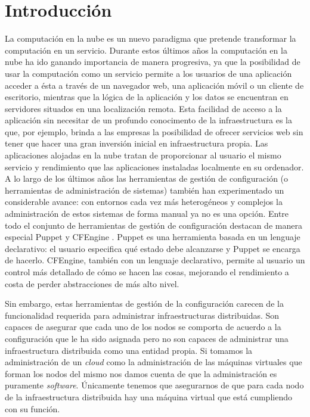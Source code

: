 \chapter{Introducción}
\label{cap:introduccion}


La computación en la nube es un nuevo paradigma que pretende transformar la computación en un servicio. Durante estos últimos años la computación en la nube ha ido ganando importancia de manera progresiva, ya que la posibilidad de usar la computación como un servicio permite a los usuarios de una aplicación acceder a ésta a través de un navegador web, una aplicación móvil o un cliente de escritorio, mientras que la lógica de la aplicación y los datos se encuentran en servidores situados en una localización remota. Esta facilidad de acceso a la aplicación sin necesitar de un profundo conocimento de la infraestructura es la que, por ejemplo, brinda a las empresas la posibilidad de ofrecer servicios web sin tener que hacer una gran inversión inicial en infraestructura propia. Las aplicaciones alojadas en la nube tratan de proporcionar al usuario el mismo servicio y rendimiento que las aplicaciones instaladas localmente en su ordenador.\\

A lo largo de los últimos años las herramientas de gestión de configuración (o herramientas de administración de sistemas) también han experimentado un considerable avance: con entornos cada vez más heterogéneos y complejos la administración de estos sistemas de forma manual ya no es una opción. Entre todo el conjunto de herramientas de gestión de configuración destacan de manera especial Puppet \cite{puppetlabs} y CFEngine \cite{cfengine}. Puppet es una herramienta basada en un lenguaje declarativo: el usuario especifica qué estado debe alcanzarse y Puppet se encarga de hacerlo. CFEngine, también con un lenguaje declarativo, permite al usuario un control más detallado de cómo se hacen las cosas, mejorando el rendimiento a costa de perder abstracciones de más alto nivel.

Sin embargo, estas herramientas de gestión de la configuración carecen de la funcionalidad requerida para administrar infraestructuras distribuidas. Son capaces de asegurar que cada uno de los nodos se comporta de acuerdo a la configuración que le ha sido asignada pero no son capaces de administrar una infraestructura distribuida como una entidad propia. Si tomamos la administración de un \emph{cloud} como la administración de las máquinas virtuales que forman los nodos del mismo nos damos cuenta de que la administración es puramente \emph{software}. Únicamente tenemos que asegurarnos de que para cada nodo de la infraestructura distribuida hay una máquina virtual que está cumpliendo con su función.\\

